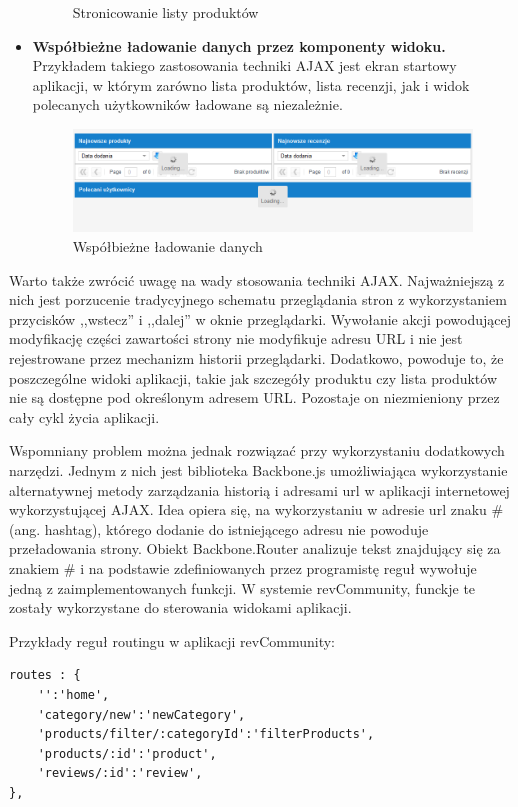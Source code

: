 \begin{itemize}
\begin{figure}[h]
	\caption{Stronicowanie listy produktów}
\end{figure}
\item\textbf{Współbieżne ładowanie danych przez komponenty widoku.} Przykładem takiego zastosowania techniki AJAX jest ekran startowy aplikacji, w którym zarówno lista produktów, lista recenzji, jak i widok polecanych użytkowników ładowane są niezależnie.
\begin{figure}[h]
	\centering
	\includegraphics[scale=0.7]{images/Loading.png}
	\caption{Współbieżne ładowanie danych}
\end{figure}
\end{itemize}


Warto także zwrócić uwagę na wady stosowania techniki AJAX. Najważniejszą z nich jest porzucenie tradycyjnego schematu przeglądania stron z wykorzystaniem przycisków ,,wstecz'' i ,,dalej'' w oknie przeglądarki. Wywołanie akcji powodującej modyfikację części zawartości strony nie modyfikuje adresu URL i nie jest rejestrowane przez mechanizm historii przeglądarki. Dodatkowo, powoduje to, że poszczególne widoki aplikacji, takie jak szczegóły produktu czy lista produktów nie są dostępne pod określonym adresem URL. Pozostaje on niezmieniony przez cały cykl życia aplikacji.\cite{jsadv}

Wspomniany problem można jednak rozwiązać przy wykorzystaniu dodatkowych narzędzi. Jednym z nich jest biblioteka Backbone.js umożliwiająca wykorzystanie alternatywnej metody zarządzania historią i adresami url w aplikacji internetowej wykorzystującej AJAX. Idea opiera się, na wykorzystaniu w adresie url znaku \# (ang. hashtag), którego dodanie do istniejącego adresu nie powoduje przeładowania strony.\cite{urls} Obiekt Backbone.Router analizuje tekst znajdujący się za znakiem \# i na podstawie zdefiniowanych przez programistę reguł wywołuje jedną z zaimplementowanych funkcji. W systemie revCommunity, funckje te zostały wykorzystane do sterowania widokami aplikacji.\cite{backbone}

Przykłady reguł routingu w aplikacji revCommunity:

\begin{lstlisting}
routes : {
	'':'home',
	'category/new':'newCategory',
	'products/filter/:categoryId':'filterProducts',
	'products/:id':'product',
	'reviews/:id':'review',
},
\end{lstlisting}

